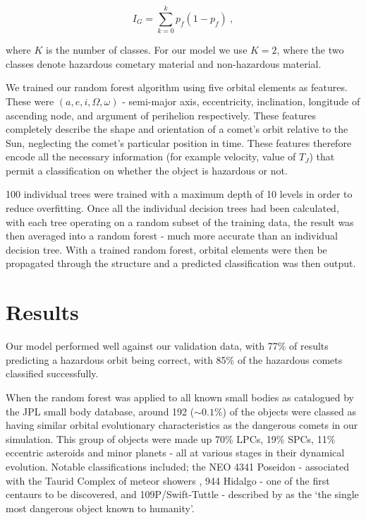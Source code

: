 \vspace{-1ex}
\begin{equation}
   I_G =  \sum_{k = 0}^k p_f(1-p_f)~,
\end{equation}

where $K$ is the number of classes. For our model we use $K=2$, where the two classes denote hazardous cometary material and non-hazardous material. 

We trained our random forest algorithm using five orbital elements as features. These were $(a,e,i,\Omega,\omega)$ - semi-major axis, eccentricity, inclination, longitude of ascending node, and argument of perihelion respectively. These features completely describe the shape and orientation of a comet's orbit relative to the Sun, neglecting the comet's particular position in time. These features therefore encode all the necessary information (for example velocity, value of $T_J$) that permit a classification on whether the object is hazardous or not.

100 individual trees were trained with a maximum depth of 10 levels in order to reduce overfitting. Once all the individual decision trees had been calculated, with each tree operating on a random subset of the training data, the result was then averaged into a random forest - much more accurate than an individual decision tree. With a trained random forest, orbital elements were then be propagated through the structure and a predicted classification was then output.

\section{Results}

Our model performed well against our validation data, with 77\% of results predicting a hazardous orbit being correct, with 85\% of the hazardous comets classified successfully. 


When the random forest was applied to all known small bodies as catalogued by the JPL small body database, around 192 ($\sim0.1\%$) of the objects were classed as having similar orbital evolutionary characteristics as the dangerous comets in our simulation. This group of objects were made up 70\% LPCs, 19\% SPCs, 11\% eccentric asteroids and minor planets - all at various stages in their dynamical evolution. Notable classifications included; the NEO 4341 Poseidon - associated with the Taurid Complex of meteor showers \citep{2001A&A...373..329B}, 944 Hidalgo - one of the first centaurs to be discovered, and 109P/Swift-Tuttle - described by \cite{verschuur1997impact} as the `the single most dangerous object known to humanity'.


